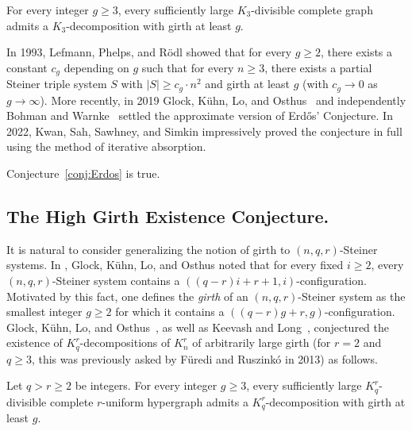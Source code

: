 \documentclass[twoside,leqno]{article}
\begin{document}
\begin{conj}\label{conj:Erdos}
For every integer $g\geq 3$, every sufficiently large $K_3$-divisible complete graph admits a $K_3$-decomposition with girth at least $g$. 
\end{conj}

In 1993, Lefmann, Phelps, and R{\"o}dl \cite{LPR93} showed that for every $g \ge 2$, there exists a constant $c_g$ depending on $g$ such that for every $n \ge 3$, there exists a partial Steiner triple system $S$ with $|S| \ge c_g \cdot n^2$ and girth at least $g$ (with $c_g \rightarrow 0$ as $g\rightarrow \infty$). More recently, in 2019 Glock, K{\"u}hn, Lo, and Osthus~\cite{GKLO20} and independently Bohman and Warnke~\cite{BW19} settled the approximate version of Erd\H{o}s' Conjecture. In 2022, Kwan, Sah, Sawhney, and Simkin \cite{KSSS2024STS} impressively proved the conjecture in full using the method of iterative absorption.

\begin{thm}\label{thm:KSSS}
Conjecture~\ref{conj:Erdos} is true.
\end{thm}

\subsection{The High Girth Existence Conjecture.} It is natural to consider generalizing the notion of girth to $(n,q,r)$-Steiner systems.  In \cite{GKLO20}, Glock, K{\"u}hn, Lo, and Osthus noted that for every fixed $i \ge 2$, every $(n, q, r)$-Steiner system contains a $((q -r)i+r+1, i)$-configuration. Motivated by this fact, one defines the \emph{girth} of an $(n, q, r)$-Steiner system as the smallest integer $g \ge 2$ for which it contains a $((q - r)g + r, g)$-configuration.  Glock, K{\"u}hn, Lo, and Osthus~\cite{GKLO20}, as well as Keevash and Long~\cite{KL20}, conjectured the existence of $K_q^r$-decompositions of $K_n^r$ of arbitrarily large girth (for $r = 2$ and $q \ge 3$, this was previously asked by F{\"u}redi and Ruszink{\'o} \cite{FR13} in 2013) as follows.

\begin{conj}\label{conj:HighGirthExistence}
Let $q>r\ge 2$ be integers. For every integer $g\geq 3$, every sufficiently large $K_q^r$-divisible complete $r$-uniform hypergraph admits a $K_q^r$-decomposition with girth at least $g$. 
\end{conj}
\end{document}
